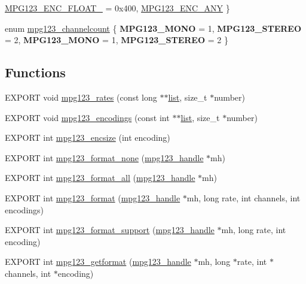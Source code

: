 \begin{DoxyCompactItemize}
\newline
\hyperlink{group__mpg123__output_ggafc8cdd60a8d3c30a09249869d835c634a883909122437922b880cedac94035829}{M\+P\+G123\+\_\+\+E\+N\+C\+\_\+\+F\+L\+O\+A\+T\+\_} = 0x400, 
\hyperlink{group__mpg123__output_ggafc8cdd60a8d3c30a09249869d835c634a25e4ffefb31c8b40fe30e57790427987}{M\+P\+G123\+\_\+\+E\+N\+C\+\_\+\+A\+NY}
 \}
\item 
enum \hyperlink{group__mpg123__output_ga94df916cae2fc81b8a6df88c1728eb1c}{mpg123\+\_\+channelcount} \{ {\bfseries M\+P\+G123\+\_\+\+M\+O\+NO} = 1, 
{\bfseries M\+P\+G123\+\_\+\+S\+T\+E\+R\+EO} = 2, 
{\bfseries M\+P\+G123\+\_\+\+M\+O\+NO} = 1, 
{\bfseries M\+P\+G123\+\_\+\+S\+T\+E\+R\+EO} = 2
 \}
\end{DoxyCompactItemize}
\subsection*{Functions}
\begin{DoxyCompactItemize}
\item 
E\+X\+P\+O\+RT void \hyperlink{group__mpg123__output_ga22414ab3551bba2b21a345ba70bdeb6a}{mpg123\+\_\+rates} (const long $\ast$$\ast$\hyperlink{protocollist-p}{list}, size\+\_\+t $\ast$number)
\item 
E\+X\+P\+O\+RT void \hyperlink{group__mpg123__output_ga187c790c6c67e51bc481231fbdefdf36}{mpg123\+\_\+encodings} (const int $\ast$$\ast$\hyperlink{protocollist-p}{list}, size\+\_\+t $\ast$number)
\item 
E\+X\+P\+O\+RT int \hyperlink{group__mpg123__output_gaa34fdc84d464e66f02cc226bef25767b}{mpg123\+\_\+encsize} (int encoding)
\item 
E\+X\+P\+O\+RT int \hyperlink{group__mpg123__output_gae05ab0b542b5172291ee5fdc4a385cb9}{mpg123\+\_\+format\+\_\+none} (\hyperlink{group__mpg123__init_ga6728e2839a395f3a07d4514da659faca}{mpg123\+\_\+handle} $\ast$mh)
\item 
E\+X\+P\+O\+RT int \hyperlink{group__mpg123__output_gadfcf3c8a9cb6d8432e05d1c38f2700c6}{mpg123\+\_\+format\+\_\+all} (\hyperlink{group__mpg123__init_ga6728e2839a395f3a07d4514da659faca}{mpg123\+\_\+handle} $\ast$mh)
\item 
E\+X\+P\+O\+RT int \hyperlink{group__mpg123__output_ga9e614a7d7c1de12e981d8f7add9a2d4b}{mpg123\+\_\+format} (\hyperlink{group__mpg123__init_ga6728e2839a395f3a07d4514da659faca}{mpg123\+\_\+handle} $\ast$mh, long rate, int channels, int encodings)
\item 
E\+X\+P\+O\+RT int \hyperlink{group__mpg123__output_gac7b885ec21c177f9efb1a586ce9fdd20}{mpg123\+\_\+format\+\_\+support} (\hyperlink{group__mpg123__init_ga6728e2839a395f3a07d4514da659faca}{mpg123\+\_\+handle} $\ast$mh, long rate, int encoding)
\item 
E\+X\+P\+O\+RT int \hyperlink{group__mpg123__output_ga47557e1d8d1b31ae4fd49ad4c54458ab}{mpg123\+\_\+getformat} (\hyperlink{group__mpg123__init_ga6728e2839a395f3a07d4514da659faca}{mpg123\+\_\+handle} $\ast$mh, long $\ast$rate, int $\ast$channels, int $\ast$encoding)
\end{DoxyCompactItemize}


